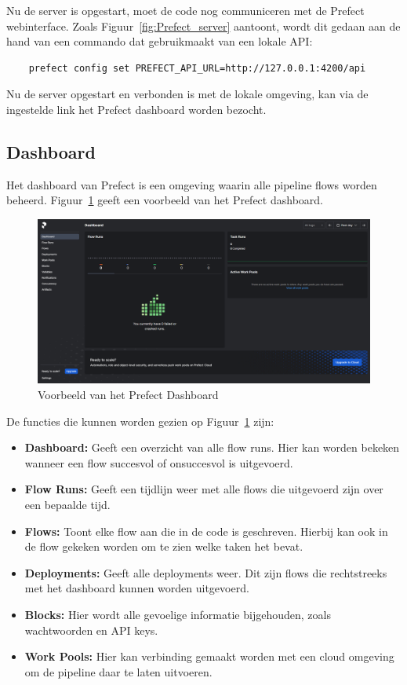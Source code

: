 Nu de server is opgestart, moet de code nog communiceren met de Prefect webinterface. Zoals Figuur~\ref{fig:Prefect_server} aantoont, wordt dit gedaan aan de hand van een commando dat gebruikmaakt van een lokale API:

\begin{verbatim}
    prefect config set PREFECT_API_URL=http://127.0.0.1:4200/api
\end{verbatim}

Nu de server opgestart en verbonden is met de lokale omgeving, kan via de ingestelde link het Prefect dashboard worden bezocht.

\subsection{Dashboard}

Het dashboard van Prefect is een omgeving waarin alle pipeline flows worden beheerd. Figuur~\ref{fig:Prefect_Dashboard} geeft een voorbeeld van het Prefect dashboard.

\begin{figure}
    \centering
    \includegraphics[width=0.9\linewidth]{graphics/Prefect_dashboard.PNG}
    \caption{Voorbeeld van het Prefect Dashboard}
    \label{fig:Prefect_Dashboard}
\end{figure}

De functies die kunnen worden gezien op Figuur~\ref{fig:Prefect_Dashboard} zijn:

\begin{itemize}
    \item \textbf{Dashboard:} Geeft een overzicht van alle flow runs. Hier kan worden bekeken wanneer een flow succesvol of onsuccesvol is uitgevoerd.
    \item \textbf{Flow Runs:} Geeft een tijdlijn weer met alle flows die uitgevoerd zijn over een bepaalde tijd.
    \item \textbf{Flows:} Toont elke flow aan die in de code is geschreven. Hierbij kan ook in de flow gekeken worden om te zien welke taken het bevat.
    \item \textbf{Deployments:} Geeft alle deployments weer. Dit zijn flows die rechtstreeks met het dashboard kunnen worden uitgevoerd.
    \item \textbf{Blocks:} Hier wordt alle gevoelige informatie bijgehouden, zoals wachtwoorden en API keys.
    \item \textbf{Work Pools:} Hier kan verbinding gemaakt worden met een cloud omgeving om de pipeline daar te laten uitvoeren.
\end{itemize}

